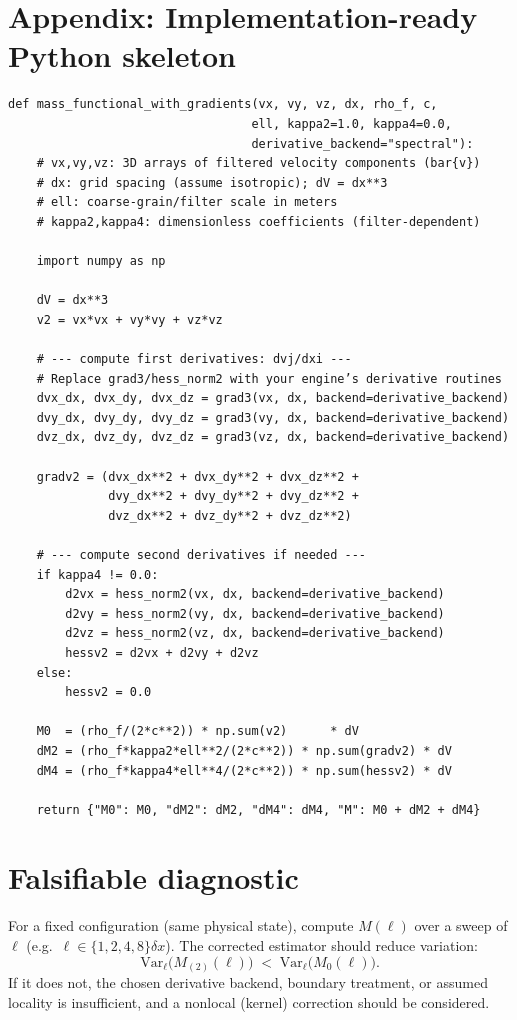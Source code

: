 \documentclass[11pt]{article}
\begin{document}
\section{Appendix: Implementation-ready Python skeleton}
\begin{verbatim}
def mass_functional_with_gradients(vx, vy, vz, dx, rho_f, c,
                                  ell, kappa2=1.0, kappa4=0.0,
                                  derivative_backend="spectral"):
    # vx,vy,vz: 3D arrays of filtered velocity components (bar{v})
    # dx: grid spacing (assume isotropic); dV = dx**3
    # ell: coarse-grain/filter scale in meters
    # kappa2,kappa4: dimensionless coefficients (filter-dependent)

    import numpy as np

    dV = dx**3
    v2 = vx*vx + vy*vy + vz*vz

    # --- compute first derivatives: dvj/dxi ---
    # Replace grad3/hess_norm2 with your engine’s derivative routines
    dvx_dx, dvx_dy, dvx_dz = grad3(vx, dx, backend=derivative_backend)
    dvy_dx, dvy_dy, dvy_dz = grad3(vy, dx, backend=derivative_backend)
    dvz_dx, dvz_dy, dvz_dz = grad3(vz, dx, backend=derivative_backend)

    gradv2 = (dvx_dx**2 + dvx_dy**2 + dvx_dz**2 +
              dvy_dx**2 + dvy_dy**2 + dvy_dz**2 +
              dvz_dx**2 + dvz_dy**2 + dvz_dz**2)

    # --- compute second derivatives if needed ---
    if kappa4 != 0.0:
        d2vx = hess_norm2(vx, dx, backend=derivative_backend)
        d2vy = hess_norm2(vy, dx, backend=derivative_backend)
        d2vz = hess_norm2(vz, dx, backend=derivative_backend)
        hessv2 = d2vx + d2vy + d2vz
    else:
        hessv2 = 0.0

    M0  = (rho_f/(2*c**2)) * np.sum(v2)      * dV
    dM2 = (rho_f*kappa2*ell**2/(2*c**2)) * np.sum(gradv2) * dV
    dM4 = (rho_f*kappa4*ell**4/(2*c**2)) * np.sum(hessv2) * dV

    return {"M0": M0, "dM2": dM2, "dM4": dM4, "M": M0 + dM2 + dM4}
\end{verbatim}

\section{Falsifiable diagnostic}
For a fixed configuration (same physical state), compute $M(\ell)$ over a sweep of $\ell$ (e.g.\ $\ell\in\{1,2,4,8\}\delta x$). The corrected estimator should reduce variation:
\begin{equation}
\mathrm{Var}_\ell\big(M_{(2)}(\ell)\big)\;<\;\mathrm{Var}_\ell\big(M_0(\ell)\big).
\end{equation}
If it does not, the chosen derivative backend, boundary treatment, or assumed locality is insufficient, and a nonlocal (kernel) correction should be considered.
\end{document}
